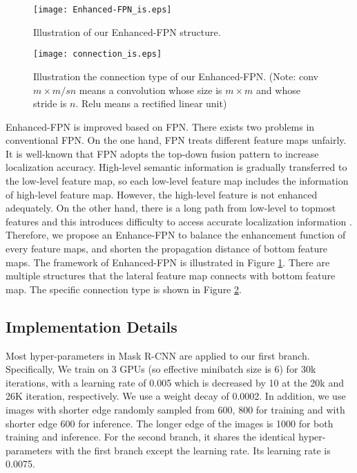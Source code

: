 \documentclass{article}
\begin{document}
\begin{figure}[t]
    \centering\texttt{[image: Enhanced-FPN\_is.eps]}
    \caption{Illustration of our Enhanced-FPN structure.}
    \label{fig:Enhanced-FPN}
    \end{figure}

    \begin{figure}[h]
    \centering\texttt{[image: connection\_is.eps]}
    \caption{Illustration the connection type of our Enhanced-FPN. (Note: conv $m \times m/sn$ means a convolution whose size is $m \times m$ and whose stride is $n$. Relu means a rectified linear unit)}
    \label{fig:connection}
    \end{figure}
    Enhanced-FPN is improved based on FPN.
    There exists two problems in conventional FPN.
    On the one hand, FPN treats different feature maps unfairly.
    It is well-known that FPN adopts the top-down fusion pattern to increase localization accuracy.
    High-level semantic information is gradually transferred to the low-level feature map, so each low-level feature map includes the information of high-level feature map.
    However, the high-level feature is not enhanced adequately.
    On the other hand, there is a long path from low-level to topmost features and this introduces difficulty to access accurate localization information \cite{Panet}.
    Therefore, we propose an Enhance-FPN to balance the enhancement function of every feature maps, and shorten the propagation distance of bottom feature maps.
    The framework of Enhanced-FPN is illustrated in Figure \ref{fig:Enhanced-FPN}.
    There are multiple structures that the lateral feature map connects with bottom feature map.
    The specific connection type is shown in Figure \ref{fig:connection}.

\subsection{Implementation Details}
\label{ssec:implementation details}
Most hyper-parameters in Mask R-CNN are applied to our first branch. Specifically, We train on 3 GPUs (so effective minibatch size is 6) for 30k iterations, with a learning rate of 0.005 which is decreased by 10 at the 20k and 26K iteration, respectively. We use a weight decay of 0.0002. In addition, we use images with shorter edge randomly sampled from {600, 800} for training and with shorter edge 600 for inference. The longer edge of the images is 1000 for both training and inference. For the second branch, it shares the identical hyper-parameters with the first branch except the learning rate. Its learning rate is 0.0075.
\end{document}
